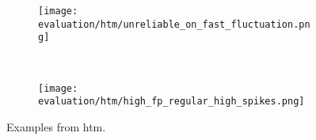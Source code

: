 \begin{figure}
    \ContinuedFloat{}
    \begin{subfigure}[b]{\linewidth}
        \centering
        \texttt{[image: evaluation/htm/unreliable\_on\_fast\_fluctuation.png]}
        \label{fig:htm-subtle-overlooked}
    \end{subfigure}
    \\
    \begin{subfigure}[b]{\linewidth}
        \centering
        \texttt{[image: evaluation/htm/high\_fp\_regular\_high\_spikes.png]}
        \label{fig:htm-spikes}
    \end{subfigure}
\caption{Examples from \gls{htm}.}\label{fig:htm-output}
\end{figure}    



